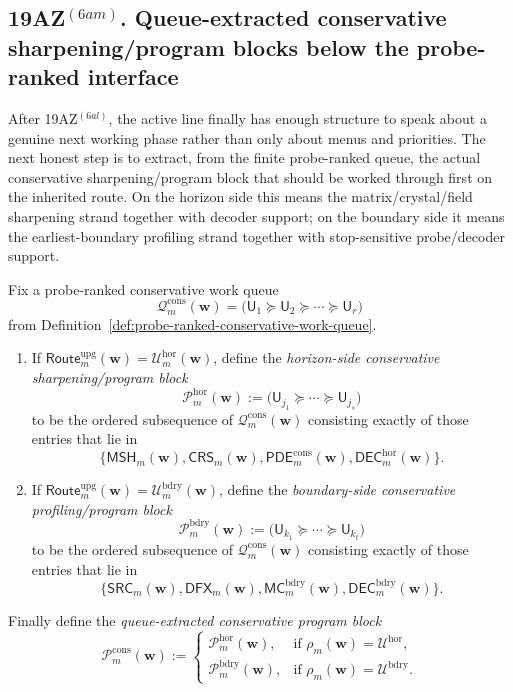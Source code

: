 \subsection*{19AZ$^{(6am)}$. Queue-extracted conservative sharpening/program blocks below the probe-ranked interface}
\label{sec:queue-extracted-conservative-sharpening-program-blocks-below-the-probe-ranked-interface}
After 19AZ$^{(6al)}$, the active line finally has enough structure to speak about a genuine next working phase rather than only about menus and priorities. The next honest step is to extract, from the finite probe-ranked queue, the actual conservative sharpening/program block that should be worked through first on the inherited route. On the horizon side this means the matrix/crystal/field sharpening strand together with decoder support; on the boundary side it means the earliest-boundary profiling strand together with stop-sensitive probe/decoder support.

\begin{definition}
\label{def:queue-extracted-conservative-sharpening-program-block}
Fix a probe-ranked conservative work queue
\[
 \mathcal Q^{\mathrm{cons}}_{m}(\mathbf w)
 =
 \bigl(\mathsf U_1\succcurlyeq \mathsf U_2\succcurlyeq \cdots \succcurlyeq \mathsf U_r\bigr)
\]
from Definition~\ref{def:probe-ranked-conservative-work-queue}.
\begin{enumerate}[label=(\roman*)]
 \item If \(\mathsf{Route}^{\mathrm{upg}}_{m}(\mathbf w)=\mathcal U^{\mathrm{hor}}_{m}(\mathbf w)\), define the \emph{horizon-side conservative sharpening/program block}
 \[
 \mathcal P^{\mathrm{hor}}_{m}(\mathbf w)
 :=
 \bigl(\mathsf U_{j_1}\succcurlyeq \cdots \succcurlyeq \mathsf U_{j_s}\bigr)
 \]
 to be the ordered subsequence of \(\mathcal Q^{\mathrm{cons}}_{m}(\mathbf w)\) consisting exactly of those entries that lie in
 \[
 \{\mathsf{MSH}_{m}(\mathbf w),\mathsf{CRS}_{m}(\mathbf w),\mathsf{PDE}^{\mathrm{cons}}_{m}(\mathbf w),\mathsf{DEC}^{\mathrm{hor}}_{m}(\mathbf w)\}.
 \]
 \item If \(\mathsf{Route}^{\mathrm{upg}}_{m}(\mathbf w)=\mathcal U^{\mathrm{bdry}}_{m}(\mathbf w)\), define the \emph{boundary-side conservative profiling/program block}
 \[
 \mathcal P^{\mathrm{bdry}}_{m}(\mathbf w)
 :=
 \bigl(\mathsf U_{k_1}\succcurlyeq \cdots \succcurlyeq \mathsf U_{k_t}\bigr)
 \]
 to be the ordered subsequence of \(\mathcal Q^{\mathrm{cons}}_{m}(\mathbf w)\) consisting exactly of those entries that lie in
 \[
 \{\mathsf{SRC}_{m}(\mathbf w),\mathsf{DFX}_{m}(\mathbf w),\mathsf{MC}^{\mathrm{bdry}}_{m}(\mathbf w),\mathsf{DEC}^{\mathrm{bdry}}_{m}(\mathbf w)\}.
 \]
\end{enumerate}
Finally define the \emph{queue-extracted conservative program block}
\[
 \mathcal P^{\mathrm{cons}}_{m}(\mathbf w)
 :=
 \begin{cases}
 \mathcal P^{\mathrm{hor}}_{m}(\mathbf w), & \text{if }\rho_m(\mathbf w)=\mathcal U^{\mathrm{hor}},\\[2mm]
 \mathcal P^{\mathrm{bdry}}_{m}(\mathbf w), & \text{if }\rho_m(\mathbf w)=\mathcal U^{\mathrm{bdry}}.
 \end{cases}
\]
\end{definition}

